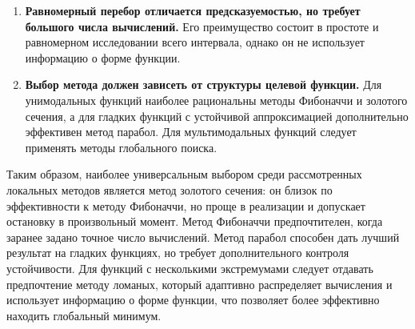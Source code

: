 \begin{enumerate}
    \item \textbf{Равномерный перебор отличается предсказуемостью, но требует
    большого числа вычислений.} Его преимущество состоит в простоте и
    равномерном исследовании всего интервала, однако он не использует
    информацию о форме функции.

    \item \textbf{Выбор метода должен зависеть от структуры целевой функции.}
    Для унимодальных функций наиболее рациональны методы Фибоначчи и золотого
    сечения, а для гладких функций с устойчивой аппроксимацией дополнительно
    эффективен метод парабол. Для мультимодальных функций следует применять
    методы глобального поиска.
\end{enumerate}

Таким образом, наиболее универсальным выбором среди рассмотренных локальных
методов является метод золотого сечения: он близок по эффективности к методу
Фибоначчи, но проще в реализации и допускает остановку в произвольный момент.
Метод Фибоначчи предпочтителен, когда заранее задано точное число вычислений.
Метод парабол способен дать лучший результат на гладких функциях, но требует
дополнительного контроля устойчивости. Для функций с несколькими экстремумами
следует отдавать предпочтение методу ломаных, который адаптивно распределяет 
вычисления и использует информацию о форме функции, что позволяет более эффективно
находить глобальный минимум.